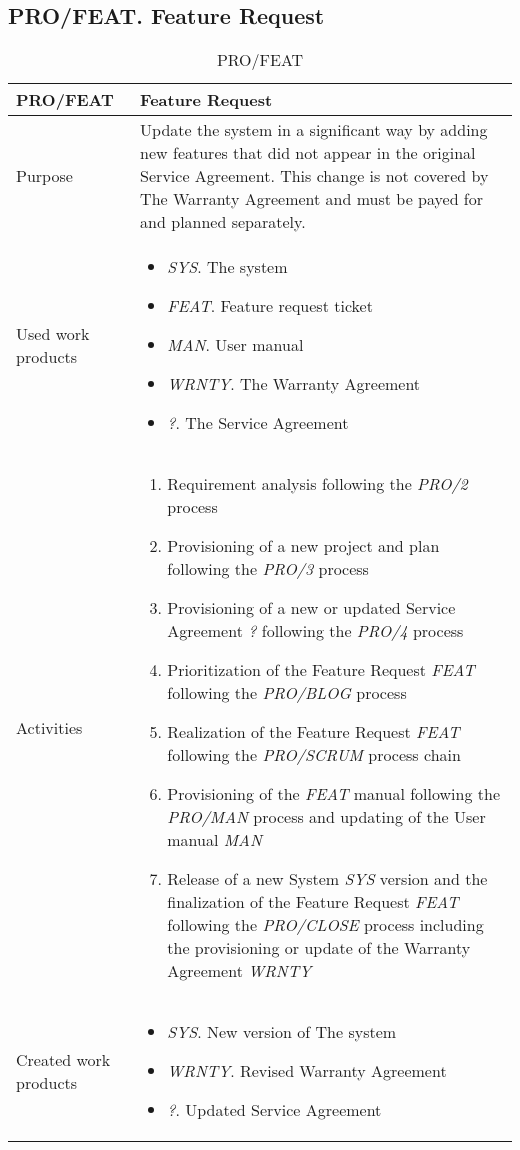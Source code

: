 \subsection{PRO/FEAT. Feature Request}
\begin{table}[h]
\begin{tabular}{l|p{}}
\hline
\textbf{PRO/FEAT}        & \textbf{Feature Request} \\ \hline
Purpose & Update the system in a significant way by adding new features that did not appear in the original Service Agreement. This change is not covered by The Warranty Agreement and must be payed for and planned separately. \\ \hline
Used work products    &      
\begin{itemize}
    \item \textit{SYS}. The system
    \item \textit{FEAT}. Feature request ticket
    \item \textit{MAN}. User manual
    \item \textit{WRNTY}. The Warranty Agreement
    \item \textit{?}. The Service Agreement
\end{itemize}
\\ \hline
Activities            &   
\begin{enumerate}
    \item Requirement analysis following the \textit{PRO/2} process
    \item Provisioning of a new project and plan following the \textit{PRO/3} process
    \item Provisioning of a new or updated Service Agreement \textit{?} following the \textit{PRO/4} process
    \item Prioritization of the Feature Request \textit{FEAT} following the \textit{PRO/BLOG} process
    \item Realization of the Feature Request \textit{FEAT} following the \textit{PRO/SCRUM} process chain
    \item Provisioning of the \textit{FEAT} manual following the \textit{PRO/MAN} process and updating of the User manual \textit{MAN}
    \item Release of a new System \textit{SYS} version and the finalization of the Feature Request \textit{FEAT} following the \textit{PRO/CLOSE} process including the provisioning or update of the Warranty Agreement \textit{WRNTY}
\end{enumerate}
\\ \hline
Created work products &     
\begin{itemize}
    \item \textit{SYS}. New version of The system
    \item \textit{WRNTY}. Revised Warranty Agreement
    \item \textit{?}. Updated Service Agreement
\end{itemize}
\end{tabular}
\caption{PRO/FEAT}
\label{pro/FEAT}
\end{table}



